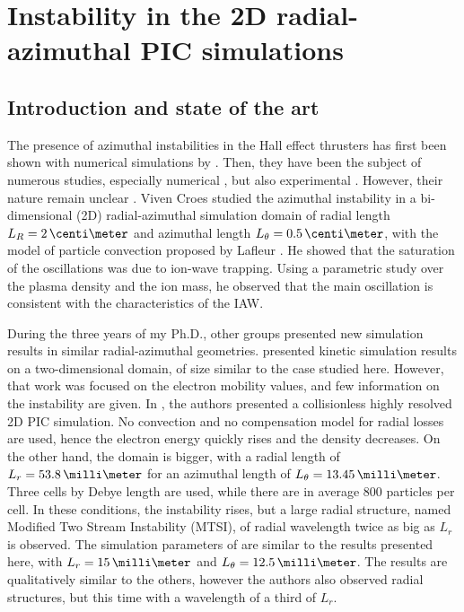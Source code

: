 
\section{Instability in the \acs{2D} radial-azimuthal \acs{PIC} simulations}
  \label{sec-PIC-ECDI}
  
  \subsection{Introduction and state of the art} \label{subsec-indroECDI}
        
    The presence of azimuthal instabilities in the Hall effect thrusters has first been shown with numerical simulations by \citet{adam2004}.
    Then, they have been the subject of numerous studies, especially numerical \citep{ducrocq2006,lafleur2016,lafleur2016a,croes2017,croes2018,janhunen2018,taccogna2019}, but also experimental \citep{honore2011,cavalier2013,cavalier2013a}.
    However, their nature remain unclear \citep{boeuf2018}.
    Viven Croes studied the azimuthal instability in a bi-dimensional (\acs{2D}) radial-azimuthal simulation domain of radial length $L_R=2\,\centi\meter$ and azimuthal length $L_{\theta}=0.5\,\centi\meter$, with the model of particle convection proposed by Lafleur \citep{croes2017,croes2018}.
    He showed that the saturation of the oscillations was due to ion-wave trapping.
    Using a parametric study over the plasma density and the ion mass, he observed that the main oscillation is consistent with the characteristics of the \ac{IAW}.
    
    During the three years of my Ph.D., other groups presented new simulation results in similar radial-azimuthal geometries.
    \citet{hara2019a} presented kinetic simulation results on a two-dimensional domain, of size similar to the case studied here.
    However, that work was focused on the electron mobility values, and few information on the instability are given.
    In \citet{janhunen2018}, the authors presented a collisionless highly resolved \acs{2D} \ac{PIC} simulation.
    No convection and no compensation model for radial losses are used, hence the electron energy quickly rises and the density decreases.
    On the other hand, the domain is bigger, with a radial length of $L_r = 53.8\,\milli\meter$ for an azimuthal length of $L_{\theta} = 13.45 \,\milli\meter$.
    Three cells by Debye length are used, while there are in average 800 particles per cell.
    In these conditions, the instability rises, but a large radial structure, named Modified Two Stream Instability (MTSI), of radial wavelength twice as big as $L_r$  is observed.
    The simulation parameters of \citet{taccogna2019} are similar to the results presented here, with  $L_r = 15\,\milli\meter$ and $L_{\theta} = 12.5 \,\milli\meter$.
    The results are qualitatively similar to the others, however the authors also observed radial structures, but this time with a wavelength of a third of $L_r$.
        
